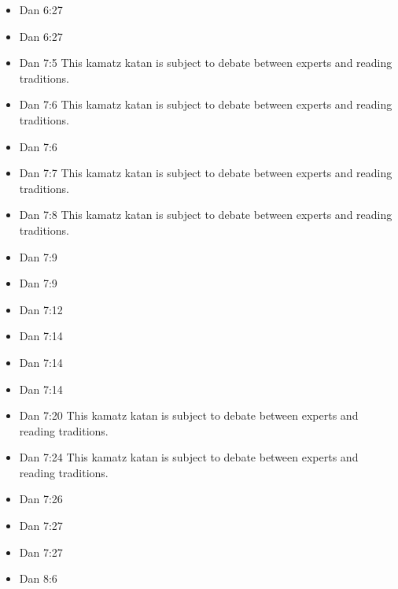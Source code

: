 \documentclass[14pt]{book}
\begin{document}
\begin{multicols}{2}
\begin{itemize}
\item Dan 6:27

\item Dan 6:27

\item Dan 7:5 This kamatz katan is subject to debate between experts and reading traditions.

\item Dan 7:6 This kamatz katan is subject to debate between experts and reading traditions.

\item Dan 7:6

\item Dan 7:7 This kamatz katan is subject to debate between experts and reading traditions.

\item Dan 7:8 This kamatz katan is subject to debate between experts and reading traditions.

\item Dan 7:9

\item Dan 7:9

\item Dan 7:12

\item Dan 7:14

\item Dan 7:14

\item Dan 7:14

\item Dan 7:20 This kamatz katan is subject to debate between experts and reading traditions.

\item Dan 7:24 This kamatz katan is subject to debate between experts and reading traditions.

\item Dan 7:26

\item Dan 7:27

\item Dan 7:27

\item Dan 8:6


\end{itemize}
\end{multicols}
\end{document}

